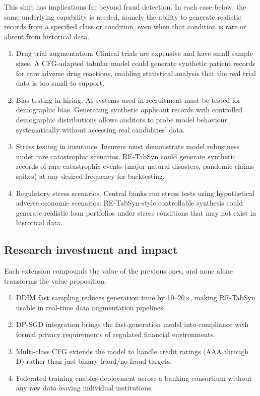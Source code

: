 This shift has implications far beyond fraud detection. In each case below, the same underlying capability is needed, namely the ability to generate realistic records from a specified class or condition, even when that condition is rare or absent from historical data.
\begin{enumerate}
    \item Drug trial augmentation. Clinical trials are expensive and have small sample sizes. A CFG-adapted tabular model could generate synthetic patient records for rare adverse drug reactions, enabling statistical analysis that the real trial data is too small to support.
    \item Bias testing in hiring. AI systems used in recruitment must be tested for demographic bias. Generating synthetic applicant records with controlled demographic distributions allows auditors to probe model behaviour systematically without accessing real candidates' data.
    \item Stress testing in insurance. Insurers must demonstrate model robustness under rare catastrophic scenarios. RE-TabSyn could generate synthetic records of rare catastrophic events (major natural disasters, pandemic claims spikes) at any desired frequency for backtesting.
    \item Regulatory stress scenarios. Central banks run stress tests using hypothetical adverse economic scenarios. RE-TabSyn-style controllable synthesis could generate realistic loan portfolios under stress conditions that may not exist in historical data.
\end{enumerate}

\subsection{Research investment and impact}

Each extension compounds the value of the previous ones, and none alone transforms the value proposition.
\begin{enumerate}
    \item DDIM fast sampling reduces generation time by 10--20$\times$, making RE-TabSyn usable in real-time data augmentation pipelines.
    \item DP-SGD integration brings the fast-generation model into compliance with formal privacy requirements of regulated financial environments.
    \item Multi-class CFG extends the model to handle credit ratings (AAA through D) rather than just binary fraud/no-fraud targets.
    \item Federated training enables deployment across a banking consortium without any raw data leaving individual institutions.
\end{enumerate}

